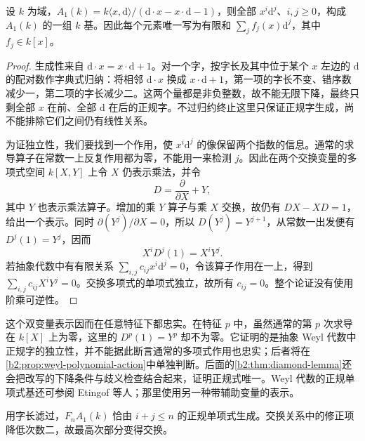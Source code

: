 \begin{theorem}\label{b2:thm:weyl-normal-basis}
	设 \(k\) 为域，\(A_1(k)=k\langle x,\mathrm{d}\rangle/(\mathrm{d}\cdot x-x\cdot\mathrm{d}-1)\)，则全部 \(x^i\mathrm{d}^j\)、\(i,j\ge0\)，构成 \(A_1(k)\) 的一组 \(k\) 基。因此每个元素唯一写为有限和 \(\sum_j f_j(x)\mathrm{d}^j\)，其中 \(f_j\in k[x]\)。
\end{theorem}
\begin{proof}
	生成性来自 \(\mathrm{d}\cdot x=x\cdot\mathrm{d}+1\)。对一个字，按字长及其中位于某个 \(x\) 左边的 \(\mathrm{d}\) 的配对数作字典式归纳：将相邻 \(\mathrm{d}\cdot x\) 换成 \(x\cdot\mathrm{d}+1\)，第一项的字长不变、错序数减少一，第二项的字长减少二。这两个量都是非负整数，故不能无限下降，最终只剩全部 \(x\) 在前、全部 \(\mathrm{d}\) 在后的正规字。不过归约终止这里只保证正规字生成，尚不能排除它们之间仍有线性关系。

	为证独立性，我们要找到一个作用，使 \(x^i\mathrm{d}^j\) 的像保留两个指数的信息。通常的求导算子在常数一上反复作用都为零，不能用一来检测 \(j\)。因此在两个交换变量的多项式空间 \(k[X,Y]\) 上令 \(X\) 仍表示乘法，并令
	\[
		D=\frac{\partial}{\partial X}+Y,
	\]
	其中 \(Y\) 也表示乘法算子。增加的乘 \(Y\) 算子与乘 \(X\) 交换，故仍有 \(DX-XD=1\)，给出一个表示。同时 \(\partial(Y^j)/\partial X=0\)，所以 \(D(Y^j)=Y^{j+1}\)，从常数一出发便有 \(D^j(1)=Y^j\)，因而
	\[
		X^iD^j(1)=X^iY^j.
	\]
	若抽象代数中有有限关系 \(\sum_{i,j}c_{ij}x^i\mathrm{d}^j=0\)，令该算子作用在一上，得到 \(\sum_{i,j}c_{ij}X^iY^j=0\)。交换多项式的单项式独立，故所有 \(c_{ij}=0\)。整个论证没有使用阶乘可逆性。
\end{proof}

这个双变量表示因而在任意特征下都忠实。在特征 \(p\) 中，虽然通常的第 \(p\) 次求导在 \(k[X]\) 上为零，这里的 \(D^p(1)=Y^p\) 却不为零。它证明的是抽象 Weyl 代数中正规字的独立性，并不能据此断言通常的多项式作用也忠实；后者将在\cref{b2:prop:weyl-polynomial-action}中单独判断。后面的\cref{b2:thm:diamond-lemma}还会把改写的下降条件与歧义检查结合起来，证明正规式唯一。Weyl 代数的正规单项式基还可参阅 Etingof 等人\cite[Proposition 2.7.1(i), pp. 17--18]{EtingofEtAl2011RepresentationTheory}；那里使用另一种带辅助变量的表示。

\ProseParagraphBreak
用字长滤过，\(F_nA_1(k)\) 恰由 \(i+j\le n\) 的正规单项式生成。交换关系中的修正项降低次数二，故最高次部分变得交换。

